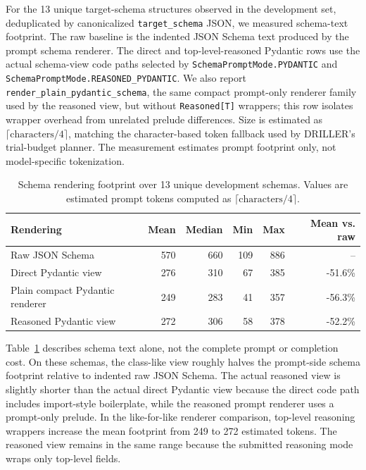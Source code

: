 \FloatBarrier

For the 13 unique target-schema structures observed in the development set, deduplicated by canonicalized \texttt{target\_schema} JSON, we measured schema-text footprint. The raw baseline is the indented JSON Schema text produced by the prompt schema renderer. The direct and top-level-reasoned Pydantic rows use the actual schema-view code paths selected by \texttt{SchemaPromptMode.PYDANTIC} and \texttt{SchemaPromptMode.REASONED\_PYDANTIC}. We also report \texttt{render\_plain\_pydantic\_schema}, the same compact prompt-only renderer family used by the reasoned view, but without \texttt{Reasoned[T]} wrappers; this row isolates wrapper overhead from unrelated prelude differences. Size is estimated as \(\lceil \mathrm{characters}/4 \rceil\), matching the character-based token fallback used by DRILLER's trial-budget planner. The measurement estimates prompt footprint only, not model-specific tokenization.

\begin{table}[!htbp]
\centering
\small
\caption{Schema rendering footprint over 13 unique development schemas. Values are estimated prompt tokens computed as \(\lceil \mathrm{characters}/4 \rceil\).}
\label{tab:schema-footprint}
\begin{tabular}{@{}lrrrrr@{}}
\toprule
Rendering & Mean & Median & Min & Max & Mean vs. raw \\
\midrule
Raw JSON Schema & 570 & 660 & 109 & 886 & -- \\
Direct Pydantic view & 276 & 310 & 67 & 385 & -51.6\% \\
Plain compact Pydantic renderer & 249 & 283 & 41 & 357 & -56.3\% \\
Reasoned Pydantic view & 272 & 306 & 58 & 378 & -52.2\% \\
\bottomrule
\end{tabular}
\end{table}

\FloatBarrier

Table~\ref{tab:schema-footprint} describes schema text alone, not the complete prompt or completion cost. On these schemas, the class-like view roughly halves the prompt-side schema footprint relative to indented raw JSON Schema. The actual reasoned view is slightly shorter than the actual direct Pydantic view because the direct code path includes import-style boilerplate, while the reasoned prompt renderer uses a prompt-only prelude. In the like-for-like renderer comparison, top-level reasoning wrappers increase the mean footprint from 249 to 272 estimated tokens. The reasoned view remains in the same range because the submitted reasoning mode wraps only top-level fields.

